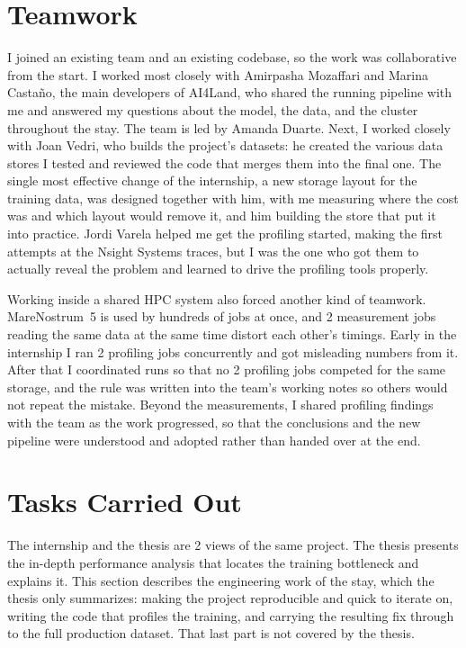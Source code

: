 \documentclass[12pt,a4paper]{article}
\begin{document}
\section{Teamwork}

I joined an existing team and an existing codebase, so the work was collaborative from the
start. I worked most closely with Amirpasha Mozaffari and Marina Casta\~{n}o, the main developers of
AI4Land, who shared the running pipeline with me and answered my questions about the model, the
data, and the cluster throughout the stay. The team is led by Amanda Duarte. Next, I worked closely
with Joan Vedri, who builds the project's datasets: he created the various data stores I tested and
reviewed the code that merges them into the final one. The single most effective change of the
internship, a new storage layout for the training data, was designed together with him, with me
measuring where the cost was and which layout would remove it, and him building the store that put
it into practice. Jordi Varela helped me get the profiling started, making the first attempts at the
Nsight Systems traces, but I was the one who got them to actually reveal the problem and learned to
drive the profiling tools properly.

Working inside a shared HPC system also forced another kind of teamwork. MareNostrum~5 is used
by hundreds of jobs at once, and 2 measurement jobs reading the same data at the same time
distort each other's timings. Early in the internship I ran 2 profiling jobs concurrently and
got misleading numbers from it. After that I coordinated runs so that no 2 profiling jobs
competed for the same storage, and the rule was written into the team's working notes so others
would not repeat the mistake. Beyond the measurements, I shared profiling findings with the team
as the work progressed, so that the conclusions and the new pipeline were understood and adopted
rather than handed over at the end.

\section{Tasks Carried Out}

The internship and the thesis are 2 views of the same project. The thesis presents the in-depth
performance analysis that locates the training bottleneck and explains it. This section describes
the engineering work of the stay, which the thesis only summarizes: making the project
reproducible and quick to iterate on, writing the code that profiles the training, and carrying
the resulting fix through to the full production dataset. That last part is not covered by the
thesis.
\end{document}
